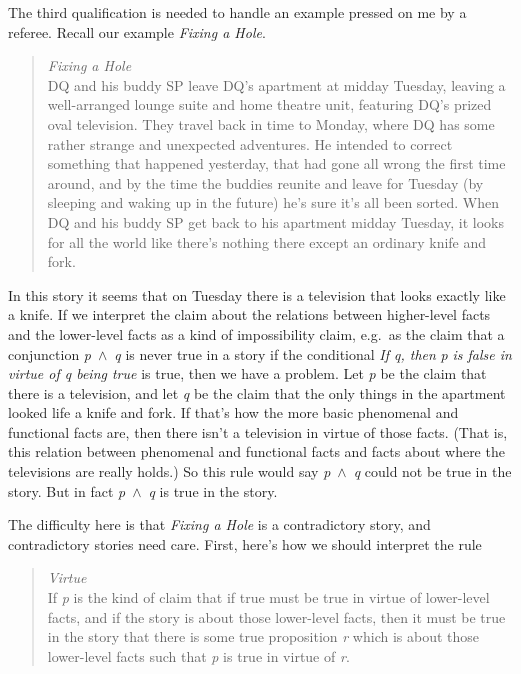 \documentclass[
  11pt,
  letterpaper,
  DIV=11,
  numbers=noendperiod,
  twoside]{scrartcl}
\begin{document}
The third qualification is needed to handle an example pressed on me by
a referee. Recall our example \emph{Fixing a Hole}.

\begin{quote}
\emph{Fixing a Hole}\\
DQ and his buddy SP leave DQ's apartment at midday Tuesday, leaving a
well-arranged lounge suite and home theatre unit, featuring DQ's prized
oval television. They travel back in time to Monday, where DQ has some
rather strange and unexpected adventures. He intended to correct
something that happened yesterday, that had gone all wrong the first
time around, and by the time the buddies reunite and leave for Tuesday
(by sleeping and waking up in the future) he's sure it's all been
sorted. When DQ and his buddy SP get back to his apartment midday
Tuesday, it looks for all the world like there's nothing there except an
ordinary knife and fork.
\end{quote}

In this story it seems that on Tuesday there is a television that looks
exactly like a knife. If we interpret the claim about the relations
between higher-level facts and the lower-level facts as a kind of
impossibility claim, e.g.~as the claim that a conjunction
\emph{p}~\({\wedge}\)~\emph{q} is never true in a story if the
conditional \emph{If q, then} \emph{p} \emph{is false in virtue of q
being true} is true, then we have a problem. Let \emph{p} be the claim
that there is a television, and let \emph{q} be the claim that the only
things in the apartment looked life a knife and fork. If that's how the
more basic phenomenal and functional facts are, then there isn't a
television in virtue of those facts. (That is, this relation between
phenomenal and functional facts and facts about where the televisions
are really holds.) So this rule would say \emph{p}~\({\wedge}\)~\emph{q}
could not be true in the story. But in fact
\emph{p}~\({\wedge}\)~\emph{q} is true in the story.

The difficulty here is that \emph{Fixing a Hole} is a contradictory
story, and contradictory stories need care. First, here's how we should
interpret the rule

\begin{quote}
\emph{Virtue}\\
If \emph{p} is the kind of claim that if true must be true in virtue of
lower-level facts, and if the story is about those lower-level facts,
then it must be true in the story that there is some true proposition
\emph{r} which is about those lower-level facts such that \emph{p} is
true in virtue of \emph{r}.
\end{quote}
\end{document}
